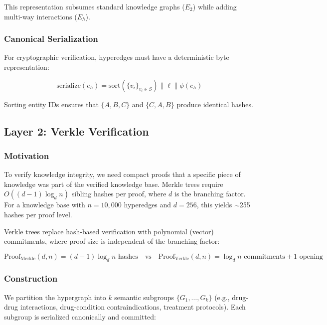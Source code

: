 \documentclass[11pt,a4paper]{article}
\begin{document}
This representation subsumes standard knowledge graphs ($E_2$) while adding multi-way interactions ($E_h$).

\subsubsection{Canonical Serialization}

For cryptographic verification, hyperedges must have a deterministic byte representation:

\begin{equation}
\text{serialize}(e_h) = \text{sort}(\{v_i\}_{v_i \in S}) \| \ell \| \phi(e_h)
\label{eq:serialize}
\end{equation}

Sorting entity IDs ensures that $\{A, B, C\}$ and $\{C, A, B\}$ produce identical hashes.

\subsection{Layer 2: Verkle Verification}
\label{sec:verkle}

\subsubsection{Motivation}

To verify knowledge integrity, we need compact proofs that a specific piece of knowledge was part of the verified knowledge base. Merkle trees require $O((d-1) \log_d n)$ sibling hashes per proof, where $d$ is the branching factor. For a knowledge base with $n = 10{,}000$ hyperedges and $d = 256$, this yields $\sim$255 hashes per proof level.

Verkle trees \citep{kuszmaul2019verkle} replace hash-based verification with polynomial (vector) commitments, where proof size is independent of the branching factor:

\begin{equation}
\text{Proof}_{\text{Merkle}}(d, n) = (d-1) \log_d n \text{ hashes} \quad \text{vs} \quad \text{Proof}_{\text{Verkle}}(d, n) = \log_d n \text{ commitments} + 1 \text{ opening}
\label{eq:proof_size}
\end{equation}

\subsubsection{Construction}

We partition the hypergraph into $k$ semantic subgroups $\{G_1, \ldots, G_k\}$ (e.g., drug-drug interactions, drug-condition contraindications, treatment protocols). Each subgroup is serialized canonically and committed:
\end{document}
